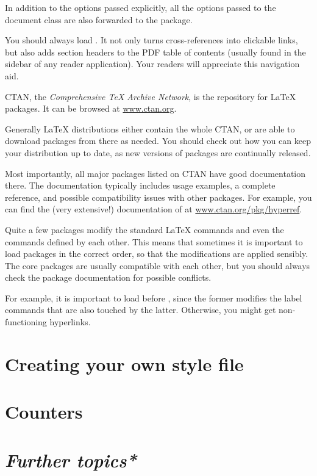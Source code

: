 In addition to the options passed explicitly,
all the options passed to the document class are also forwarded to the package.

\begin{practices}
You should always load .
It not only turns cross-references into clickable links,
but also adds section headers to the PDF table of contents
(usually found in the sidebar of any reader application).
Your readers will appreciate this navigation aid.
\end{practices}

CTAN, the \emph{Comprehensive \TeX{} Archive Network},
is the repository for \LaTeX{} packages.
It can be browsed at \url{www.ctan.org}.

Generally \LaTeX{} distributions either contain the whole CTAN,
or are able to download packages from there as needed.
You should check out how you can keep your distribution up to date,
as new versions of packages are continually released.

Most importantly, all major packages listed on CTAN have good documentation there.
The documentation typically includes usage examples, a complete reference,
and possible compatibility issues with other packages.
For example, you can find the (very extensive!) documentation of 
at \url{www.ctan.org/pkg/hyperref}.



\begin{gotcha}
Quite a few packages modify the standard \LaTeX{} commands
and even the commands defined by each other.
This means that sometimes it is important to load packages in the correct order,
so that the modifications are applied sensibly.
The core packages are usually compatible with each other,
but you should always check the package documentation for possible conflicts.

For example, it is important to load  before ,
since the former modifies the label commands that are also touched by the latter.
Otherwise, you might get non-functioning hyperlinks.
\end{gotcha}



\section{Creating your own style file}


\section{Counters}


\section{\emph{Further topics*}}





